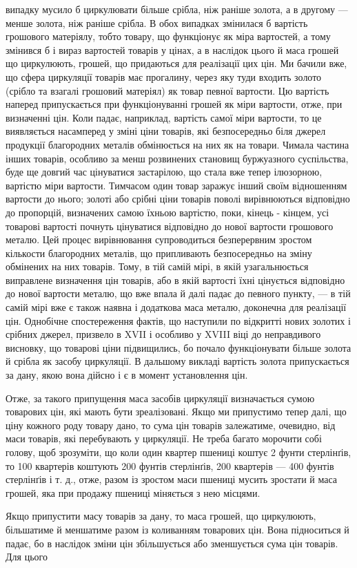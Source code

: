 випадку мусило б циркулювати більше срібла, ніж раніше золота,
а в другому — менше золота, ніж раніше срібла. В обох випадках
змінилася б вартість грошового матеріялу, тобто товару,
що функціонує як міра вартостей, а тому змінився б і вираз
вартостей товарів у цінах, а в наслідок цього й маса грошей
що циркулюють, грошей, що придаються для реалізації цих
цін. Ми бачили вже, що сфера циркуляції товарів має прогалину,
через яку туди входить золото (срібло та взагалі грошовий
матеріял) як товар певної вартости. Цю вартість наперед припускається
при функціонуванні грошей як міри вартости, отже,
при визначенні цін. Коли падає, наприклад, вартість самої міри
вартости, то це виявляється насамперед у зміні ціни товарів,
які безпосередньо біля джерел продукції благородних металів
обмінюється на них як на товари. Чимала частина інших товарів,
особливо за менш розвинених становищ буржуазного суспільства,
буде ще довгий час цінуватися застарілою, що стала вже тепер
ілюзорною, вартістю міри вартости. Тимчасом один товар заражує
інший своїм відношенням вартости до нього; золоті або
срібні ціни товарів поволі вирівнюються відповідно до пропорцій,
визначених самою їхньою вартістю, поки, кінець - кінцем, усі
товарові вартості почнуть цінуватися відповідно до нової вартости
грошового металю. Цей процес вирівнювання супроводиться
безперервним зростом кількости благородних металів, що припливають
безпосередньо на зміну обмінених на них товарів.
Тому, в тій самій мірі, в якій узагальнюється виправлене визначення
цін товарів, або в якій вартості їхні цінується відповідно
до нової вартости металю, що вже впала й далі падає до певного
пункту, — в тій самій мірі вже є також наявна і додаткова
маса металю, доконечна для реалізації цін. Однобічне спостереження
фактів, що наступили по відкритті нових золотих і срібних
джерел, призвело в XVII і особливо у XVIII віці до неправдивого
висновку, що товарові ціни підвищились, бо почало функціонувати
більше золота й срібла як засобу циркуляції. В дальшому
викладі вартість золота припускається за дану, якою вона
дійсно і є в момент установлення цін.

Отже, за такого припущення маса засобів циркуляції визначається
сумою товарових цін, які мають бути зреалізовані. Якщо
ми припустимо тепер далі, що ціну кожного роду товару дано,
то сума цін товарів залежатиме, очевидно, від маси товарів,
які перебувають у циркуляції. Не треба багато морочити собі
голову, щоб зрозуміти, що коли один квартер пшениці коштує
2 фунти стерлінґів, то 100 квартерів коштують 200 фунтів стерлінґів,
200 квартерів — 400 фунтів стерлінґів і т. д., отже, разом
із зростом маси пшениці мусить зростати й маса грошей, яка
при продажу пшениці міняється з нею місцями.

Якщо припустити масу товарів за дану, то маса грошей, що
циркулюють, більшатиме й меншатиме разом із коливанням
товарових цін. Вона підноситься й падає, бо в наслідок зміни
цін збільшується або зменшується сума цін товарів. Для цього
